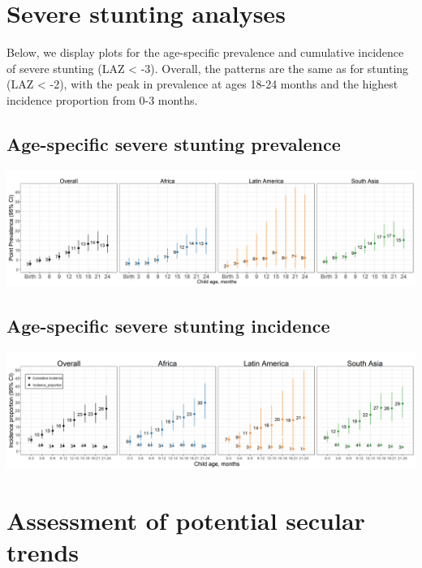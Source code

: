 \documentclass[9pt,]{book}
\begin{document}
\hypertarget{severe-stunting}{%
\chapter{Severe stunting analyses}\label{severe-stunting}}

\raggedright

Below, we display plots for the age-specific prevalence and cumulative incidence of severe stunting (LAZ \textless{} -3). Overall, the patterns are the same as for stunting (LAZ \textless{} -2), with the peak in prevalence at ages 18-24 months and the highest incidence proportion from 0-3 months.

\hypertarget{age-specific-severe-stunting-prevalence}{%
\section{Age-specific severe stunting prevalence}\label{age-specific-severe-stunting-prevalence}}

\includegraphics[width=58.33in]{figure-copies/fig-stunt-3-prev-overall_region--allage-primary}

\hypertarget{age-specific-severe-stunting-incidence}{%
\section{Age-specific severe stunting incidence}\label{age-specific-severe-stunting-incidence}}

\includegraphics[width=58.33in]{figure-copies/fig-stunt-3-inc-overall_region--allage-primary}

\hypertarget{secular-trends}{%
\chapter{Assessment of potential secular trends}\label{secular-trends}}
\end{document}
